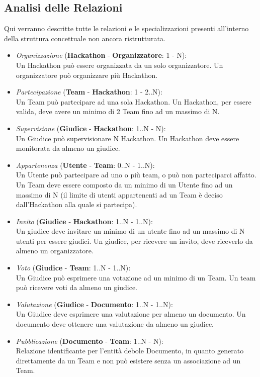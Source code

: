 \documentclass[a4paper, 11pt]{article}
\begin{document}
	\subsection{Analisi delle Relazioni}
	Qui verranno descritte tutte le relazioni e le specializzazioni presenti all'interno della struttura concettuale non ancora ristrutturata.
	\begin{itemize}
		\item \textit{Organizzazione} (\textbf{Hackathon} - \textbf{Organizzatore}: 1 - N):\\Un Hackathon può essere organizzata da un solo organizzatore. Un organizzatore può organizzare più Hackathon.
		\item \textit{Partecipazione} (\textbf{Team} - \textbf{Hackathon}: 1 - 2..N):\\Un Team può partecipare ad una sola Hackathon. Un Hackathon, per essere valida, deve avere un minimo di 2 Team fino ad un massimo di N.
		\item \textit{Supervisione} (\textbf{Giudice} - \textbf{Hackathon}: 1..N - N):\\Un Giudice può supervisionare N Hackathon. Un Hackathon deve essere monitorata da almeno un giudice.
		\item \textit{Appartenenza} (\textbf{Utente} - \textbf{Team}: 0..N - 1..N):\\Un Utente può partecipare ad uno o più team, o può non parteciparci affatto. Un Team deve essere composto da un minimo di un Utente fino ad un massimo di N (il limite di utenti appartenenti ad un Team è deciso dall'Hackathon alla quale si partecipa).
		\item \textit{Invito} (\textbf{Giudice} - \textbf{Hackathon}: 1..N - 1..N):\\Un giudice deve invitare un minimo di un utente fino ad un massimo di N utenti per essere giudici. Un giudice, per ricevere un invito, deve riceverlo da almeno un organizzatore.
		\item \textit{Voto} (\textbf{Giudice} - \textbf{Team}: 1..N - 1..N):\\Un Giudice può esprimere una votazione ad un minimo di un Team. Un team può ricevere voti da almeno un giudice.
		\item \textit{Valutazione} (\textbf{Giudice} - \textbf{Documento}: 1..N - 1..N):\\Un Giudice deve esprimere una valutazione per almeno un documento. Un documento deve ottenere una valutazione da almeno un giudice.
		\item \textit{Pubblicazione} (\textbf{Documento} - \textbf{Team}: 1..N - N):\\Relazione identificante per l'entità debole Documento, in quanto generato direttamente da un Team e non può esistere senza un associazione ad un Team.
	\end{itemize}
	\newpage
\end{document}
